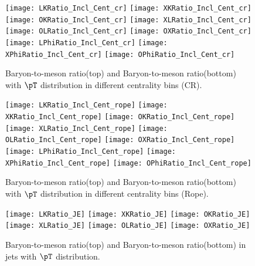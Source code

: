 \begin{figure}[ht]
	\begin{center}
		\texttt{[image: LKRatio\_Incl\_Cent\_cr]}
		\texttt{[image: XKRatio\_Incl\_Cent\_cr]}
		\texttt{[image: OKRatio\_Incl\_Cent\_cr]}
		\texttt{[image: XLRatio\_Incl\_Cent\_cr]}
		\texttt{[image: OLRatio\_Incl\_Cent\_cr]}
		\texttt{[image: OXRatio\_Incl\_Cent\_cr]}
                \texttt{[image: LPhiRatio\_Incl\_Cent\_cr]}
                \texttt{[image: XPhiRatio\_Incl\_Cent\_cr]}
                \texttt{[image: OPhiRatio\_Incl\_Cent\_cr]}
	\end{center}
	\caption{Baryon-to-meson ratio(top) and Baryon-to-meson ratio(bottom) with $\pT$ distribution in different centrality bins (CR).}
	\label{fig:InclParRatioCentcr}
\end{figure}

\begin{figure}[ht]
        \begin{center}
                \texttt{[image: LKRatio\_Incl\_Cent\_rope]}
                \texttt{[image: XKRatio\_Incl\_Cent\_rope]}
                \texttt{[image: OKRatio\_Incl\_Cent\_rope]}
                \texttt{[image: XLRatio\_Incl\_Cent\_rope]}
                \texttt{[image: OLRatio\_Incl\_Cent\_rope]}
                \texttt{[image: OXRatio\_Incl\_Cent\_rope]}
                \texttt{[image: LPhiRatio\_Incl\_Cent\_rope]}
                \texttt{[image: XPhiRatio\_Incl\_Cent\_rope]}
                \texttt{[image: OPhiRatio\_Incl\_Cent\_rope]}
        \end{center}
	\caption{Baryon-to-meson ratio(top) and Baryon-to-meson ratio(bottom) with $\pT$ distribution in different centrality bins (Rope).}
        \label{fig:InclParRatioCentrope}
\end{figure}





\begin{figure}[ht]
        \begin{center}
                \texttt{[image: LKRatio\_JE]}
                \texttt{[image: XKRatio\_JE]}
                \texttt{[image: OKRatio\_JE]}
                \texttt{[image: XLRatio\_JE]}
                \texttt{[image: OLRatio\_JE]}
                \texttt{[image: OXRatio\_JE]}
        \end{center}
        \caption{Baryon-to-meson ratio(top) and Baryon-to-meson ratio(bottom) in jets with $\pT$ distribution.}
        \label{fig:JEParRatio}
\end{figure}

